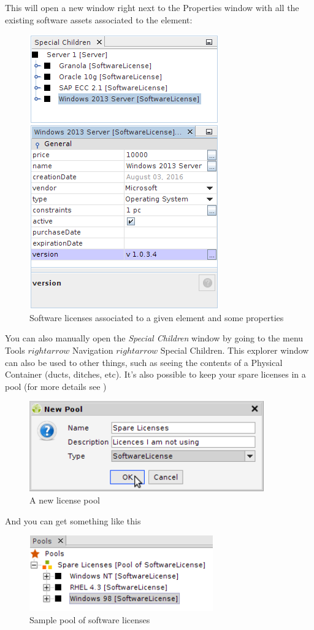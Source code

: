\documentclass[a4paper]{article}
\begin{document}
	    This  will  open a new window  right  next  to the  Properties  window  with  all  the existing software  assets associated to the element:
	    \begin{figure}[h!]
	    	\centering
	    	\includegraphics[width=0.4\linewidth]{img/software_asset_license_window.png}
	    	\caption{Software licenses associated to a given element and some properties}
	    	\label{fig:software_asset_license_window}
	    \end{figure}
	    
	    You  can  also  manually  open  the  \textit{Special  Children}  window  by  going  to  the  menu  Tools $rightarrow$ Navigation $rightarrow$ Special Children. This explorer  window  can  also  be  used  to  other  things, such  as seeing  the contents  of  a Physical  Container  (ducts,  ditches, etc).  
	    \newline
	    It’s  also  possible  to  keep  your  spare  licenses  in  a  pool  (for more details see \textbf{})
	    \begin{figure}[h!]
	    	\centering
	    	\includegraphics[width=0.5\linewidth]{img/software_asset_pool_liceses_not_used.png}
	    	\caption{A new license pool}
	    	\label{fig:software_asset_pool_liceses_not_used}
	    \end{figure}

	    And you can get something like this
		\begin{figure}[h!]
			\centering
			\includegraphics[width=0.4\linewidth]{img/software_asset_licences_not_used.png}
			\caption{Sample pool of software licenses}
			\label{fig:software_asset_licences_not_used}
		\end{figure}	
		
\end{document}
